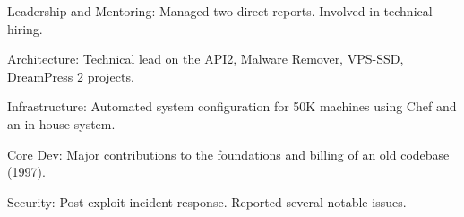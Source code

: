 
\item Leadership and Mentoring:
  Managed two direct reports.
  Involved in technical hiring.

\item Architecture:
  Technical lead on the API2, Malware Remover, VPS-SSD, DreamPress 2 projects.

\item Infrastructure:
  Automated system configuration for 50K machines using Chef and an in-house system.

\item Core Dev: Major contributions to the foundations and billing of an old codebase (1997).

\item Security:
  Post-exploit incident response.
  Reported several notable issues.



